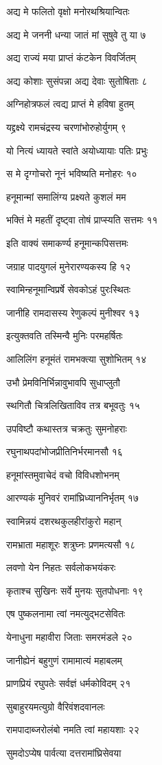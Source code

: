 अद्य मे फलितो वृक्षो मनोरथश्रियान्वितः

अद्य मे जननी धन्या जातं मां सुषुवे तु या ७

अद्य राज्यं मया प्राप्तं कंटकेन विवर्जितम्

अद्य कोशाः सुसंपन्ना अद्य देवाः सुतोषिताः ८

अग्निहोत्रफलं त्वद्य प्राप्तं मे हविषा हुतम्

यद्द्रक्ष्ये रामचंद्रस्य चरणांभोरुहोर्युगम् ९

यो नित्यं ध्यायते स्वांते अयोध्यायाः पतिः प्रभुः

स मे दृग्गोचरो नूनं भविष्यति मनोहरः १०

हनूमान्मां समालिंग्य प्रक्ष्यते कुशलं मम

भक्तिं मे महतीं दृष्ट्वा तोषं प्राप्स्यति सत्तमः ११

इति वाक्यं समाकर्ण्य हनूमान्कपिसत्तमः

जग्राह पादयुगलं मुनेरारण्यकस्य हि १२

स्वामिन्हनूमान्विप्रर्षे सेवकोऽहं पुरःस्थितः

जानीहि रामदासस्य रेणुकल्पं मुनीश्वर १३

इत्युक्तवति तस्मिन्वै मुनिः परमहर्षितः

आलिलिंग हनूमंतं रामभक्त्या सुशोभितम् १४

उभौ प्रेमविनिर्भिन्नावुभावपि सुधाप्लुतौ

स्थगितौ चित्रलिखिताविव तत्र बभूवतुः १५

उपविष्टौ कथास्तत्र चक्रतुः सुमनोहराः

रघुनाथपदांभोजप्रीतिनिर्भरमानसौ १६

हनूमांस्तमुवाचेदं वचो विविधशोभनम्

आरण्यकं मुनिवरं रामांघ्रिध्याननिर्भृतम् १७

स्वामिन्नयं दशरथकुलहीरांकुरो महान्

रामभ्राता महाशूरः शत्रुघ्नः प्रणमत्यसौ १८

लवणो येन निहतः सर्वलोकभयंकरः

कृताश्च सुखिनः सर्वे मुनयः सुतपोधनाः १९

एष पुष्कलनामा त्वां नमत्युद्भटसेवितः

येनाधुना महावीरा जिताः समरमंडले २०

जानीह्येनं बहुगुणं रामामात्यं महाबलम्

प्राणप्रियं रघुपतेः सर्वज्ञं धर्मकोविदम् २१

सुबाहुरयमत्युग्रो वैरिवंशदवानलः

रामपादाब्जरोलंबो नमति त्वां महायशाः २२

सुमदोऽप्येष पार्वत्या दत्तरामांघ्रिसेवया

